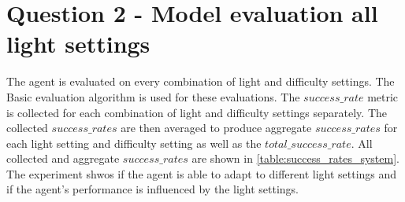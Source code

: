 \section{Question 2 - Model evaluation all light settings}

The agent is evaluated on every combination of light and difficulty settings. The Basic evaluation algorithm is used for these evaluations.
The $success\_rate$ metric is collected for each combination of light and difficulty settings separately. The collected $success\_rates$ are then averaged to produce aggregate $success\_rates$ for each light setting and difficulty setting as well as the $total\_success\_rate$. All collected and aggregate $success\_rates$ are shown in \ref{table:success_rates_system}.
The experiment shwos if the agent is able to adapt to different light settings and if the agent's performance is influenced by the light settings.

\begin{table}
    \begin{center}
    \end{center}
    \caption{Collected and aggregate success\_rate metrics}
    \label{table:success_rates_system}
\end{table}


